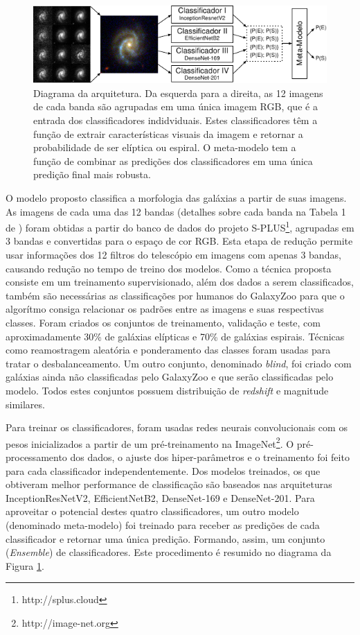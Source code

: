 \documentclass[10pt, a4paper, twocolumn]{article}
\begin{document}
\begin{figure}[!h]
  \includegraphics[width=\textwidth]{figures/arch_pt.pdf}
  \caption{Diagrama da arquitetura. Da esquerda para a direita, as 12 imagens de cada banda são agrupadas em uma única imagem RGB, que é a entrada dos classificadores indidviduais. Estes classificadores têm a função de extrair características visuais da imagem e retornar a probabilidade de ser elíptica ou espiral. O meta-modelo tem a função de combinar as predições dos classificadores em uma única predição final mais robusta.}
  \label{fig:arch}
\end{figure}

O modelo proposto classifica a morfologia das galáxias a partir de suas imagens. As imagens de cada uma das 12 bandas (detalhes sobre cada banda na Tabela 1 de \cite{oliveira2019}) foram obtidas a partir do banco de dados do projeto S-PLUS\footnote{http://splus.cloud}, agrupadas em 3 bandas e convertidas para o espaço de cor RGB. Esta etapa de redução permite usar informações dos 12 filtros do telescópio em imagens com apenas 3 bandas, causando redução no tempo de treino dos modelos. Como a técnica proposta consiste em um treinamento supervisionado, além dos dados a serem classificados, também são necessárias as classificações por humanos do GalaxyZoo para que o algorítmo consiga relacionar os padrões entre as imagens e suas respectivas classes. Foram criados os conjuntos de treinamento, validação e teste, com aproximadamente 30\% de galáxias elípticas e 70\% de galáxias espirais. Técnicas como reamostragem aleatória e ponderamento das classes foram usadas para tratar o desbalanceamento.  Um outro conjunto, denominado \emph{blind}, foi criado com galáxias ainda não classificadas pelo GalaxyZoo e que serão classificadas pelo modelo. Todos estes conjuntos possuem distribuição de \emph{redshift} e magnitude similares.

Para treinar os classificadores, foram usadas redes neurais convolucionais com os pesos inicializados a partir de um pré-treinamento na ImageNet\footnote{http://image-net.org}. O pré-processamento dos dados, o ajuste dos hiper-parâmetros e o treinamento foi feito para cada classificador independentemente. Dos modelos treinados, os que obtiveram melhor performance de classificação são baseados nas arquiteturas InceptionResNetV2, EfficientNetB2, DenseNet-169 e DenseNet-201. Para aproveitar o potencial destes quatro classificadores, um outro modelo (denominado meta-modelo) foi treinado para receber as predições de cada classificador e retornar uma única predição. Formando, assim, um conjunto (\emph{Ensemble}) de classificadores. Este procedimento é resumido no diagrama da Figura \ref{fig:arch}.
\end{document}
